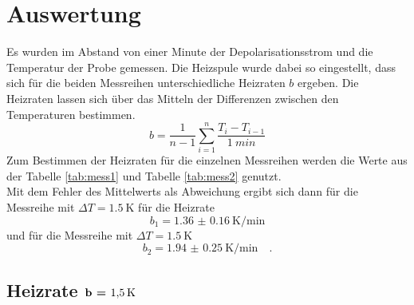 \newpage 
\section{Auswertung}

\noindent Es wurden im Abstand von einer Minute der Depolarisationsstrom und die Temperatur der Probe gemessen.
Die Heizspule wurde dabei so eingestellt, dass sich für die beiden Messreihen unterschiedliche Heizraten $b$ ergeben.
Die Heizraten lassen sich über das Mitteln der Differenzen zwischen den Temperaturen bestimmen.\\
\begin{equation*}
  b = \frac{1}{n-1} \sum_{i=1}^{n} \frac{T_i - T_{i-1}}{\SI{1}{min}}
\end{equation*}
Zum Bestimmen der Heizraten für die einzelnen Messreihen werden die Werte aus der Tabelle \ref{tab:mess1} und Tabelle \ref{tab:mess2} genutzt.\\
Mit dem Fehler des Mittelwerts als Abweichung ergibt sich dann für die Messreihe mit $\Delta T = \SI{1.5}{\kelvin}$ für die Heizrate
\begin{equation*}
  b_1 = \SI{1.36(016)}{\kelvin\per\minute}
\end{equation*}
und für die Messreihe mit $\Delta T = \SI{1.5}{\kelvin}$ 
\begin{equation*}
  b_2 = \SI{1.94(025)}{\kelvin\per\minute} \quad .
\end{equation*}

\subsection{Heizrate $\textbf{b = \SI{1.5}{\kelvin}}$}

